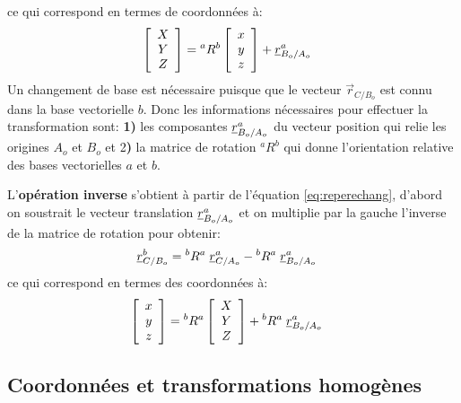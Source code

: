 ce qui correspond en termes de coordonnées à: 
\begin{align}
\left[ \begin{array}{c} 
X \\ Y \\ Z
\end{array} \right]  &=  
 {}^aR^b
\left[ \begin{array}{c} 
x \\ y \\ z
\end{array} \right] + \underline{r}_{B_o/A_o}^a 
\end{align} 
Un changement de base est nécessaire puisque que le vecteur $\vec{r}_{C/B_o}$ est connu dans la base vectorielle $b$. Donc les informations nécessaires pour effectuer la transformation sont: \textbf{1)} les composantes $\underline{r}_{B_o/A_o}^a$ du vecteur position qui relie les origines $A_o$ et $B_o$ et 2\textbf{)} la matrice de rotation $^aR^b$ qui donne l'orientation relative des bases vectorielles $a$ et $b$. 

L'\textbf{opération inverse} s'obtient à partir de l'équation \eqref{eq:reperechang}, d'abord on soustrait le vecteur translation $\underline{r}_{B_o/A_o}^a$ et on multiplie par la gauche l'inverse de la matrice de rotation pour obtenir:
\begin{align}
\underline{r}_{C/B_o}^b &= {}^bR^a \; \underline{r}_{C/A_o}^a - {}^bR^a \; \underline{r}_{B_o/A_o}^a 
\label{eq:reperechanginv}
\end{align} 
ce qui correspond en termes des coordonnées à: 
\begin{align}
\left[ \begin{array}{c} 
x \\ y \\ z
\end{array} \right]  &=  
 {}^bR^a
\left[ \begin{array}{c} 
X \\ Y \\ Z
\end{array} \right] + {}^bR^a \; \underline{r}_{B_o/A_o}^a 
\end{align} 




\subsection{Coordonnées et transformations homogènes}
\label{sec:coordhomo}

